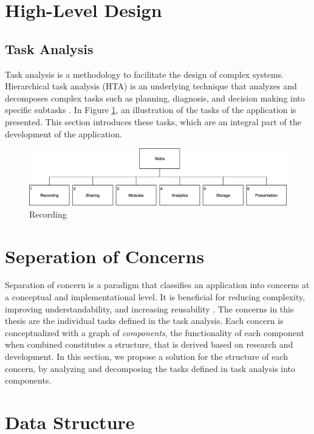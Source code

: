 

\section{High-Level Design}

\subsection{Task Analysis}
Task analysis is a methodology to facilitate the design of complex systems. Hierarchical task analysis (HTA) is an underlying technique that analyzes and decomposes complex tasks such as planning, diagnosis, and decision making into specific subtasks \cite{ta}. In Figure \ref{fig:hta_overview}, an illustration of the tasks of the application is presented. This section introduces these tasks, which are an integral part of the development of the application.

\begin{figure}
    \centering
    \includegraphics[scale=0.23]{images/TA.png}
    \caption{Recording}
    \label{fig:hta_overview}
\end{figure}



\section{Seperation of Concerns}\label{design_soc}
Separation of concern is a paradigm that classifies an application into concerns at a conceptual and implementational level. It is beneficial for reducing complexity, improving understandability, and increasing reusability \cite{soc}. The concerns in this thesis are the individual tasks defined in the task analysis. Each concern is conceptualized with a graph of \textit{components}, the functionality of each component when combined constitutes a {structure}, that is derived based on research and development. In this section, we propose a solution for the structure of each concern, by analyzing and decomposing the tasks defined in task analysis into components.



\section{Data Structure}


